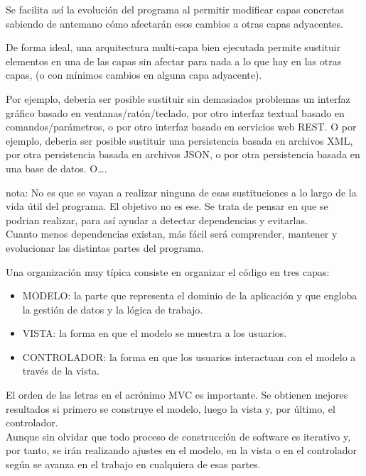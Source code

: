 \documentclass[spanish,12pt,a4paper,final,oneside]{book}
\begin{document}
Se facilita así la evolución del programa al permitir modificar capas concretas sabiendo de antemano cómo afectarán esos cambios a otras capas adyacentes.

De forma ideal, una arquitectura multi-capa bien ejecutada permite sustituir elementos en una de las capas sin afectar para nada a lo que hay en las otras capas, (o con mínimos cambios en alguna capa adyacente). 

Por ejemplo, debería ser posible sustituir sin demasiados problemas un interfaz gráfico basado en ventanas/ratón/teclado, por otro interfaz textual basado en comandos/parámetros, o por otro interfaz basado en servicios web {\footnotesize REST}. O por ejemplo, deberia ser posible sustituir una persistencia basada en archivos {\footnotesize XML}, por otra persistencia basada en archivos {\footnotesize JSON}, o por otra persistencia basada en una base de datos. O\ldots.

nota: No es que se vayan a realizar ninguna de esas sustituciones a lo largo de la vida útil del programa. El objetivo no es ese. Se trata de pensar en que se podrian realizar, para así ayudar a detectar dependencias y evitarlas.
\\Cuanto menos dependencias existan, más fácil será  comprender, mantener y evolucionar las distintas partes del programa. 

\vspace{1cm}

Una organización muy típica consiste en organizar el código en tres capas:
\begin{itemize}
\item MODELO: la parte que representa el dominio de la aplicación y que engloba la gestión de datos y la lógica de trabajo.
\item VISTA: la forma en que el modelo se muestra a los usuarios.
\item CONTROLADOR: la forma en que los usuarios interactuan con el modelo  a través de la vista.
\end{itemize}

El orden de las letras en el acrónimo MVC es importante. Se obtienen mejores resultados si primero se construye el modelo, luego la vista y, por último, el controlador. 
\\Aunque sin olvidar que todo proceso de construcción de software es iterativo y, por tanto, se irán realizando ajustes en el modelo, en la vista o en el controlador según se avanza en el trabajo en cualquiera de esas partes.
\end{document}
